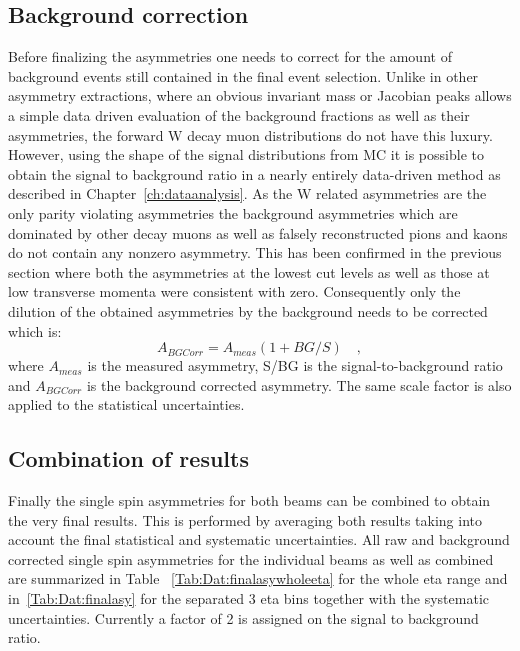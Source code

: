 \subsection{Background correction}\label{sec:bcg_correc}
Before finalizing the asymmetries one needs to correct for the amount of background events still contained in the final event selection. 
Unlike in other asymmetry extractions, where an obvious invariant mass or Jacobian peaks allows a simple data driven evaluation of the 
background fractions as well as their asymmetries, the forward W decay muon distributions do not have this luxury. However, using the 
shape of the signal distributions from MC it is possible to obtain the signal to background ratio in a nearly entirely data-driven method 
as described in Chapter~\ref{ch:dataanalysis}. %
As the W related asymmetries are the only parity violating asymmetries the background asymmetries which are dominated by other decay 
muons as well as falsely reconstructed pions and kaons do not contain any nonzero asymmetry. This has been confirmed in the previous 
section where both the asymmetries at the lowest cut levels as well as those at low transverse momenta were consistent with zero. 
Consequently only the dilution of the obtained asymmetries by the background needs to be corrected which is:
\begin{equation}
A_{BGCorr} = A_{meas} (1 + BG / S )\quad,
\end{equation}
\noindent where $A_{meas}$ is the measured asymmetry, S/BG is the signal-to-background ratio and $A_{BGCorr}$ is the background 
corrected asymmetry. The same scale factor is also applied to the statistical uncertainties.


\subsection{Combination of results}
 Finally the single spin asymmetries for both beams can be combined to obtain the very final results. This is performed by 
averaging both results taking into account the final statistical and systematic uncertainties.
All raw and  background corrected single spin asymmetries for the individual beams as well as combined are summarized in Table
~\ref{Tab:Dat:finalasywholeeta} for the whole eta range and in~\ref{Tab:Dat:finalasy} for the separated 3 eta bins
together with the systematic uncertainties. Currently a factor of 2 is assigned on the signal to background ratio.



